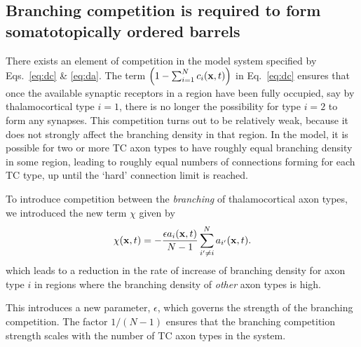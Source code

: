 \documentclass[9pt,twocolumn,twoside,lineno]{pnas-new}
\begin{document}
\subsection*{Branching competition is required to form somatotopically ordered barrels}

There exists an element of competition in the model system specified by
Eqs.~\ref{eq:dc} \& \ref{eq:da}. The term $\left(1 - \sum_{i=1}^{N}
c_i(\mathbf{x}, t)\right)$ in Eq.~\ref{eq:dc} ensures that once the available
synaptic receptors in a region have been fully occupied, say by
thalamocortical type $i=1$, there is no longer the possibility for type $i=2$
to form any synapses. This competition turns out to be relatively weak,
because it does not strongly affect the branching density in that region. In
the model, it is possible for two or more TC axon types to have roughly equal
branching density in some region, leading to roughly equal numbers of
connections forming for each TC type, up until the `hard' connection limit
is reached.

To introduce competition between the \emph{branching} of thalamocortical axon
types, we introduced the new term $\chi$ given by
%
\begin{equation} \label{eq:branch_comp}
\chi(\mathbf{x}, t) = - \frac{\epsilon  a_i(\mathbf{x}, t)}{N-1} \sum_{i' \ne i}^{N} a_{i'}(\mathbf{x}, t).
\end{equation}
%
which leads to a reduction in the rate of increase of branching density for
axon type $i$ in regions where the branching density of \emph{other} axon types
is high.

This introduces a new parameter, $\epsilon$, which governs the strength of the
branching competition. The factor $1/(N-1)$ ensures that the branching
competition strength scales with the number of TC axon types in the system.
\end{document}
